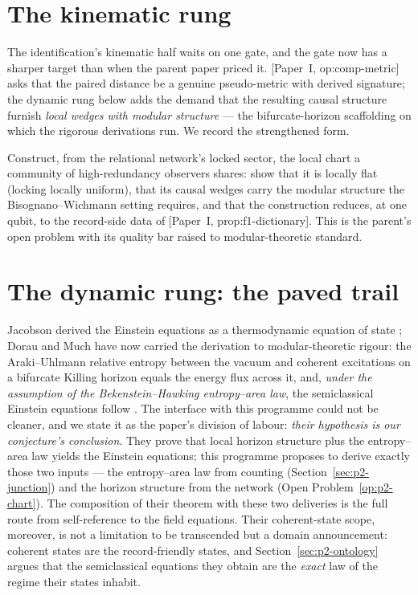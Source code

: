 \documentclass[11pt,a4paper]{article}
\newcommand{\Pone}[1]{[Paper~I, #1]} %
\begin{document}
\section{The kinematic rung}
\label{sec:p2-kinematic}


The identification's kinematic half waits on one gate, and the gate now has a sharper target than
when the parent paper priced it. \Pone{op:comp-metric} asks that the paired distance be a genuine
pseudo-metric with derived signature; the dynamic rung below adds the demand that the resulting
causal structure furnish \emph{local wedges with modular structure} --- the bifurcate-horizon
scaffolding on which the rigorous derivations run. We record the strengthened form.

\begin{openproblem}\label{op:p2-chart}
Construct, from the relational network's locked sector, the local chart a community of
high-redundancy observers shares: show that it is locally flat (locking locally uniform), that its
causal wedges carry the modular structure the Bisognano--Wichmann setting requires, and that the
construction reduces, at one qubit, to the record-side data of \Pone{prop:f1-dictionary}. This is
the parent's open problem with its quality bar raised to modular-theoretic standard.
\end{openproblem}

\section{The dynamic rung: the paved trail}
\label{sec:p2-dynamic}

Jacobson derived the Einstein equations as a thermodynamic equation of state
\autocite{Jacobson1995}; Dorau and Much have now carried the derivation to modular-theoretic
rigour: the Araki--Uhlmann relative entropy between the vacuum and coherent excitations on a
bifurcate Killing horizon equals the energy flux across it, and, \emph{under the assumption of the
Bekenstein--Hawking entropy--area law}, the semiclassical Einstein equations follow
\autocite{doraumuch2026relative}. The interface with this programme could not be cleaner, and we
state it as the paper's division of labour: \emph{their hypothesis is our conjecture's
conclusion}. They prove that local horizon structure plus the entropy--area law yields the
Einstein equations; this programme proposes to derive exactly those two inputs --- the
entropy--area law from counting (Section~\ref{sec:p2-junction}) and the horizon structure from the
network (Open Problem~\ref{op:p2-chart}). The composition of their theorem with these two
deliveries is the full route from self-reference to the field equations. Their coherent-state
scope, moreover, is not a limitation to be transcended but a domain announcement: coherent states
are the record-friendly states, and Section~\ref{sec:p2-ontology} argues that the semiclassical
equations they obtain are the \emph{exact} law of the regime their states inhabit.
\end{document}
